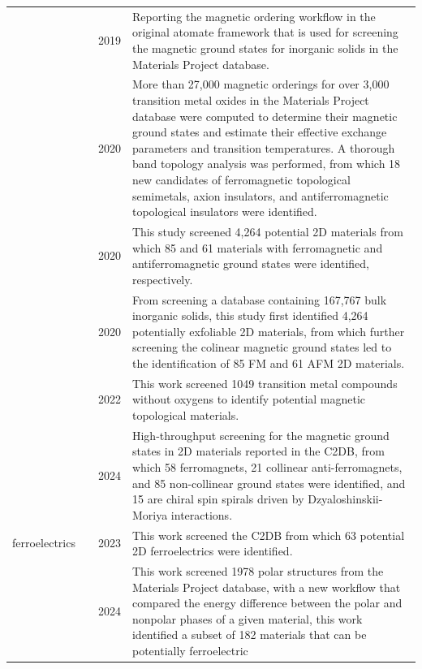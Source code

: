 \begin{longtable}{p{2cm}p{3cm}p{0.9cm}p{11cm}}
&\footnotesize{\citet{horton2019high}}
&\footnotesize{2019}
&\footnotesize{Reporting the magnetic ordering workflow in the original atomate\cite{mathew2017atomate} framework that is used for screening the magnetic ground states for inorganic solids in the Materials Project database.}\\

&\footnotesize{\citet{frey2020high}}
&\footnotesize{2020}
&\footnotesize{More than 27,000 magnetic orderings for over 3,000 transition metal oxides in the Materials Project database were computed to determine their magnetic ground states and estimate their effective exchange parameters and transition temperatures. A thorough band topology analysis was performed, from which 18 new candidates of ferromagnetic topological semimetals, axion insulators, and antiferromagnetic topological insulators were identified.}\\

&\footnotesize{\citet{torelli2020high}}
&\footnotesize{2020}
&\footnotesize{This study screened 4,264 potential 2D materials from which 85 and 61 materials with ferromagnetic and antiferromagnetic ground states were identified, respectively. }\\

&\footnotesize{\citet{torelli2020high}}
&\footnotesize{2020}
&\footnotesize{From screening a database containing 167,767 bulk inorganic solids, this study first identified 4,264 potentially exfoliable 2D materials, from which further screening the colinear magnetic ground states led to the identification of 85 FM and 61 AFM 2D materials. }\\

&\footnotesize{\citet{su2022high}}
&\footnotesize{2022}
&\footnotesize{This work screened 1049 transition metal compounds without oxygens to identify potential magnetic topological materials. }\\

&\footnotesize{\citet{sodequist2024magnetic}}
&\footnotesize{2024}
&\footnotesize{High-throughput screening for the magnetic ground states in 2D materials reported in the C2DB, from which 58 ferromagnets, 21 collinear anti-ferromagnets, and 85 non-collinear ground states were identified, and 15 are chiral spin spirals driven by  Dzyaloshinskii-Moriya interactions.}\\

ferroelectrics
&\footnotesize{\citet{kruse2023two}}
&\footnotesize{2023}
&\footnotesize{This work screened the C2DB from which 63 potential 2D ferroelectrics were identified. }\\

&\footnotesize{\citet{ricci2024candidate}}
&\footnotesize{2024}
&\footnotesize{This work screened 1978 polar structures from the Materials Project database, with a new workflow that compared the energy difference between the polar and nonpolar phases of a given material, this work identified a subset of 182 materials that can be potentially ferroelectric}\\

\end{longtable}
\endgroup


